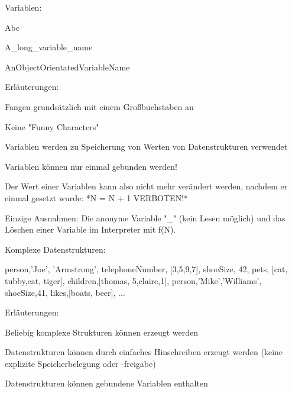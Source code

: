 \documentclass[10pt]{article}
\begin{document}
Variablen:
\begin{itemize*}
  \item Abc
  \item A\_long\_variable\_name
  \item AnObjectOrientatedVariableName
  \item Erläuterungen:
  \begin{itemize*}
    \item Fangen grundsätzlich mit einem Großbuchstaben an
    \item Keine "Funny Characters"
    \item Variablen werden zu Speicherung von Werten von Datenstrukturen verwendet
    \item Variablen können nur einmal gebunden werden!
    \item Der Wert einer Variablen kann also nicht mehr verändert werden, nachdem er einmal gesetzt wurde: *N = N + 1 VERBOTEN!*
    \item Einzige Ausnahmen: Die anonyme Variable "\_" (kein Lesen möglich) und das Löschen einer Variable im Interpreter mit f(N).
  \end{itemize*}
\end{itemize*}

Komplexe Datenstrukturen:
\begin{itemize*}
  \item [{{person,'Joe', 'Armstrong'}, {telephoneNumber, [3,5,9,7]}, {shoeSize, 42}, {pets, [{cat, tubby},{cat, tiger}]}, {children,[{thomas, 5},{claire,1}]}}, {{person,'Mike','Williams'}, {shoeSize,41}, {likes,[boats, beer]}, ... }]
  \item Erläuterungen:
  \begin{itemize*}
    \item Beliebig komplexe Strukturen können erzeugt werden
    \item Datenstrukturen können durch einfaches Hinschreiben erzeugt werden (keine explizite Speicherbelegung oder -freigabe)
    \item Datenstrukturen können gebundene Variablen enthalten
  \end{itemize*}
\end{itemize*}
\end{document}
